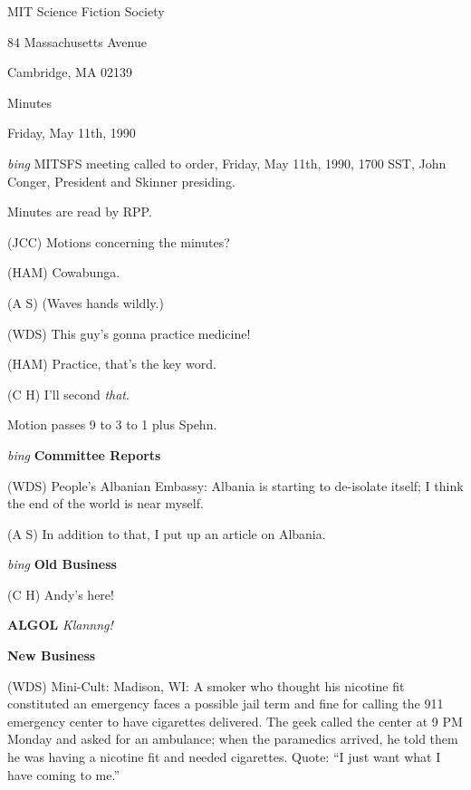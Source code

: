\setlength{\topmargin}{-0.5in}
\setlength{\oddsidemargin}{0.0in}
\setlength{\evensidemargin}{0.0in}
\setlength{\textheight}{9in}
\setlength{\textwidth}{6.5in}



\begin{center}
MIT Science Fiction Society

84 Massachusetts Avenue

Cambridge, MA 02139

\vspace{0.2in}
Minutes

Friday, May 11th, 1990

\end{center}
 
\vspace{0.15in}
{\em bing\/}  MITSFS meeting called to order, Friday, May 11th, 1990,
1700 SST, John Conger, President and Skinner presiding.

Minutes are read by RPP.

(JCC) Motions concerning the minutes?

(HAM) Cowabunga.

(A S) (Waves hands wildly.)

(WDS) This guy's gonna practice medicine!

(HAM) Practice, that's the key word.

(C H) I'll second {\em that\/}.

Motion passes 9 to 3 to 1 plus Spehn.

\vspace{0.15in}
{\em bing\/} {\bf Committee Reports}

(WDS) People's Albanian Embassy: Albania is starting to de-isolate itself; I
think the end of the world is near myself.

(A S) In addition to that, I put up an article on Albania.

\vspace{0.15in}
{\em bing\/} {\bf Old Business}

(C H) Andy's here!

{\bf ALGOL}  {\em Klannng!\/}

\vspace{0.15in}
{\bf New Business}

(WDS) Mini-Cult: Madison, WI: A smoker who thought his nicotine fit
constituted an emergency faces a possible jail term and fine for calling the
911 emergency center to have cigarettes delivered.  The geek called the center
at 9 PM Monday and asked for an ambulance; when the paramedics arrived, he
told them he was having a nicotine fit and needed cigarettes.  Quote: ``I just
want what I have coming to me.''

